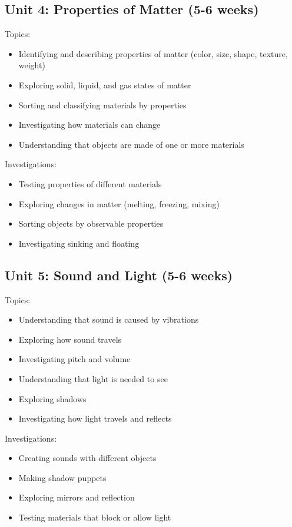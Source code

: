 \documentclass[11pt,letterpaper]{report}
\begin{document}
\subsection{Unit 4: Properties of Matter (5-6 weeks)}

Topics:
\begin{itemize}
\item Identifying and describing properties of matter (color, size, shape, texture, weight)
\item Exploring solid, liquid, and gas states of matter
\item Sorting and classifying materials by properties
\item Investigating how materials can change
\item Understanding that objects are made of one or more materials
\end{itemize}

Investigations:
\begin{itemize}
\item Testing properties of different materials
\item Exploring changes in matter (melting, freezing, mixing)
\item Sorting objects by observable properties
\item Investigating sinking and floating
\end{itemize}

\subsection{Unit 5: Sound and Light (5-6 weeks)}

Topics:
\begin{itemize}
\item Understanding that sound is caused by vibrations
\item Exploring how sound travels
\item Investigating pitch and volume
\item Understanding that light is needed to see
\item Exploring shadows
\item Investigating how light travels and reflects
\end{itemize}

Investigations:
\begin{itemize}
\item Creating sounds with different objects
\item Making shadow puppets
\item Exploring mirrors and reflection
\item Testing materials that block or allow light
\end{itemize}
\end{document}
